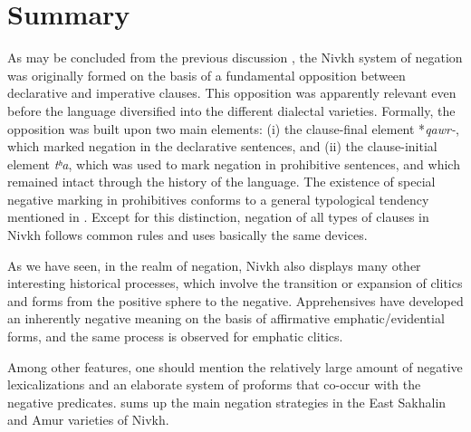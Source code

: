 \documentclass[output=paper,colorlinks,citecolor=brown]{langscibook}
\begin{document}
\section{Summary}\label{sec:niv:5} 
As may be concluded from the previous discussion , the Nivkh system of negation was originally formed on the basis of a fundamental opposition between declarative and imperative clauses. This opposition was apparently relevant even before the language diversified into the different dialectal varieties. Formally, the opposition was built upon two main elements: (i) the clause-final element *\textit{qawr-}, which marked negation in the declarative sentences, and (ii) the clause-initial element \textit{tʰa}, which was used to mark negation in prohibitive sentences, and which remained intact through the history of the language. The existence of special negative marking in prohibitives conforms to a general typological tendency mentioned in \citet{AuweraEtAl2013}. Except for this distinction, negation of all types of clauses in Nivkh follows common rules and uses basically the same devices. 

As we have seen, in the realm of negation, Nivkh also displays many other interesting historical processes, which involve the transition or expansion of clitics and forms from the positive sphere to the negative. Apprehensives have developed an inherently negative meaning on the basis of affirmative emphatic/evidential forms, and the same process is observed for emphatic clitics.

Among other features, one should mention the relatively large amount of negative lexicalizations and an elaborate system of proforms that co-occur with the negative predicates.
 sums up the main negation strategies in the East Sakhalin and Amur varieties of Nivkh.
\end{document}
